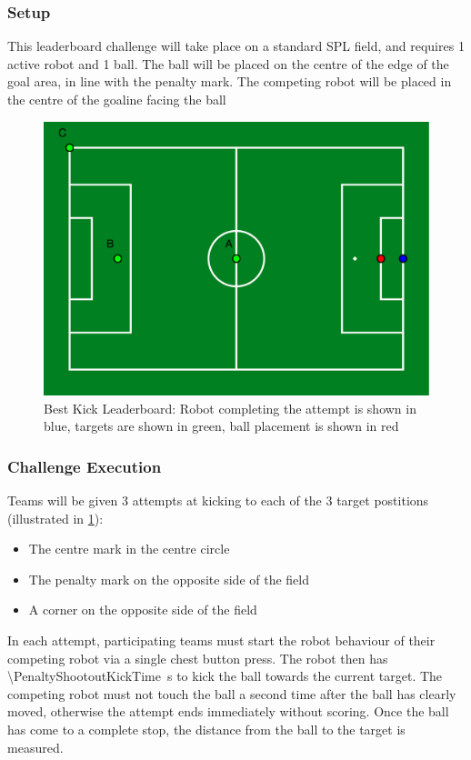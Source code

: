 \subsubsection{Setup}
This leaderboard challenge will take place on a standard SPL field, and requires 1 active robot and 1 ball.
The ball will be placed on the centre of the edge of the goal area, in line with the penalty mark.
The competing robot will be placed in the centre of the goaline facing the ball
\begin{figure}[t]
    \centerline{\includegraphics[width=\columnwidth]{figs/kick_leaderboard.pdf}}
    \caption{Best Kick Leaderboard: Robot completing the attempt is shown in blue, targets are shown in green, ball placement is shown in red}
    \label{fig:kick_leaderboard}
\end{figure}
\subsubsection{Challenge Execution}
Teams will be given 3 attempts at kicking to each of the 3 target postitions (illustrated in \cref{fig:kick_leaderboard}):
\begin{itemize}
    \item The centre mark in the centre circle
    \item The penalty mark on the opposite side of the field
    \item A corner on the opposite side of the field
\end{itemize}
In each attempt, participating teams must start the robot behaviour of their competing robot via a single chest button
press. The robot then has \qty{\PenaltyShootoutKickTime}{\second} to kick the ball towards the current target.
The competing robot must not touch the ball a second time after the ball has clearly moved,
otherwise the attempt ends immediately without scoring.
Once the ball has come to a complete stop, the distance from the ball to the target is measured.

